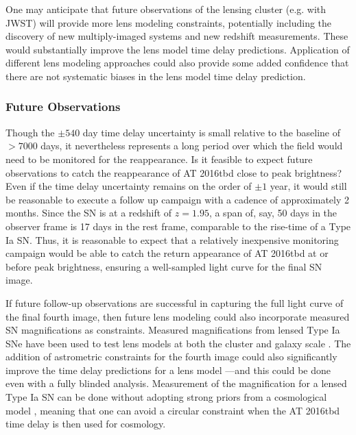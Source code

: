 \documentclass[12pt]{article}
\def\SNABC{AT 2016tbd\xspace}
\begin{document}
One may anticipate that future observations of the lensing cluster (e.g. with JWST) will provide more lens modeling constraints, potentially including the discovery of new multiply-imaged systems and new redshift measurements. These would substantially improve the lens model time delay predictions. Application of different lens modeling approaches could also provide some added confidence that there are not systematic biases in the lens model time delay prediction.


\subsubsection*{Future Observations}

Though the $\pm540$ day time delay uncertainty is small relative to the baseline of $>7000$ days, it nevertheless represents a long period over which the field would need to be monitored for the reappearance.  Is it feasible to expect future observations to catch the reappearance of \SNABC close to peak brightness? 
Even if the time delay uncertainty remains on the order of $\pm1$ year, it would still be reasonable to execute a follow up campaign with a cadence of approximately 2 months. Since the SN is at a redshift of $z=1.95$, a span of, say, 50 days in the observer frame is 17 days in the rest frame, comparable to the rise-time of a Type Ia SN.  Thus, it is reasonable to expect that a relatively inexpensive monitoring campaign would be able to catch the return appearance of \SNABC at or before peak brightness, ensuring a well-sampled light curve for the final SN image.

If future follow-up observations are successful in capturing the full light curve of the final fourth image, then future lens modeling could also incorporate measured SN magnifications as constraints.  Measured magnifications from lensed Type Ia SNe have been used to test lens models at both the cluster and galaxy scale \cite{nordin_lensed_2014, rodney_illuminating_2015, dhawan_magnification_2020}.  The addition of astrometric constraints for the fourth image could also significantly improve the time delay predictions for a lens model \cite{birrer_astrometric_2019}---and this could be done even with a fully blinded analysis.  Measurement of the magnification for a lensed Type Ia SN can be done without adopting strong priors from a cosmological model \cite{patel_three_2014}, meaning that one can avoid a circular constraint when the \SNABC time delay is then used for cosmology.
\end{document}
